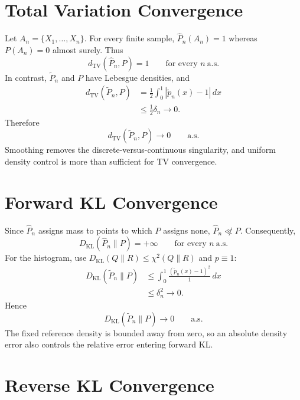 \documentclass[
  11pt,
  a4paper,
  notitlepage
]{report}
\begin{document}
\section{Total Variation
Convergence}\label{total-variation-convergence-1}

Let \(A_n=\{X_1,\ldots,X_n\}\). For every finite sample,
\(\widehat P_n(A_n)=1\) whereas \(P(A_n)=0\) almost surely. Thus \[
\boxed{d_{\mathrm{TV}}(\widehat P_n,P)=1
\qquad\text{for every }n\ \mathrm{a.s.}}
\] In contrast, \(\widetilde P_n\) and \(P\) have Lebesgue densities,
and \[
\begin{aligned}
d_{\mathrm{TV}}(\widetilde P_n,P)
&=\frac12\int_0^1|\widetilde p_n(x)-1|\,dx\\
&\le\frac12\delta_n\longrightarrow0.
\end{aligned}
\] Therefore \[
\boxed{d_{\mathrm{TV}}(\widetilde P_n,P)\longrightarrow0
\qquad\mathrm{a.s.}}
\] Smoothing removes the discrete-versus-continuous singularity, and
uniform density control is more than sufficient for TV convergence.

\section{Forward KL Convergence}\label{forward-kl-convergence}

Since \(\widehat P_n\) assigns mass to points to which \(P\) assigns
none, \(\widehat P_n\not\ll P\). Consequently, \[
\boxed{D_{\mathrm{KL}}(\widehat P_n\|P)=+\infty
\qquad\text{for every }n\ \mathrm{a.s.}}
\] For the histogram, use \(D_{\mathrm{KL}}(Q\|R)\le\chi^2(Q\|R)\) and
\(p\equiv1\): \[
\begin{aligned}
D_{\mathrm{KL}}(\widetilde P_n\|P)
&\le\int_0^1\frac{(\widetilde p_n(x)-1)^2}{1}\,dx\\
&\le\delta_n^2\longrightarrow0.
\end{aligned}
\] Hence \[
\boxed{D_{\mathrm{KL}}(\widetilde P_n\|P)\longrightarrow0
\qquad\mathrm{a.s.}}
\] The fixed reference density is bounded away from zero, so an absolute
density error also controls the relative error entering forward KL.

\section{Reverse KL Convergence}\label{reverse-kl-convergence}
\end{document}
